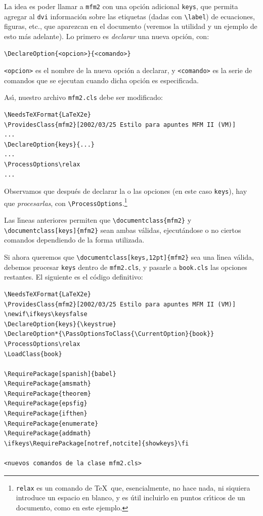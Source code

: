 {La idea es poder llamar a \verb+mfm2+ con una opci\'on adicional
\verb+keys+, que permita agregar al \verb+dvi+ informaci\'on sobre las
etiquetas (dadas con \verb+\label+) de ecuaciones, figuras, etc., que
aparezcan en el documento (veremos la utilidad y un ejemplo de esto
 m\'as adelante). Lo primero es {\em declarar\/} una nueva opci\'on,
 con:
\begin{verbatim}
\DeclareOption{<opcion>}{<comando>}
\end{verbatim}
\verb+<opcion>+ es el nombre de la nueva opci\'on a declarar, y
\verb+<comando>+ es la serie de comandos que se ejecutan cuando dicha
opci\'on es especificada. 

As\'{\i}, nuestro archivo \verb+mfm2.cls+ debe ser modificado:
\begin{verbatim}
\NeedsTeXFormat{LaTeX2e}
\ProvidesClass{mfm2}[2002/03/25 Estilo para apuntes MFM II (VM)]
...
\DeclareOption{keys}{...}
...
\ProcessOptions\relax
...
\end{verbatim}

Observamos que despu\'es de declarar la o las opciones (en este caso
\verb+keys+), hay que {\em procesarlas}, con
\verb+\ProcessOptions+.\footnote{{\tt \bslash relax} es un comando de
    \TeX\ que, esencialmente, no hace nada, ni siquiera introduce un
    espacio en blanco, y es \'util incluirlo en puntos cr\'{\i}ticos
    de un documento, como en este ejemplo.}} 

Las l\'{\i}neas anteriores permiten que \verb+\documentclass{mfm2}+ y
\verb+\documentclass[keys]{mfm2}+ sean ambas v\'alidas, ejecut\'andose
o no ciertos comandos dependiendo de la forma utilizada. 

Si ahora queremos que \verb+\documentclass[keys,12pt]{mfm2}+ sea una
l\'{\i}nea v\'alida, debemos procesar \verb+keys+ dentro de
\verb+mfm2.cls+, y pasarle a \verb+book.cls+ las opciones
restantes. El siguiente es el c\'odigo definitivo:
\begin{verbatim}
\NeedsTeXFormat{LaTeX2e}
\ProvidesClass{mfm2}[2002/03/25 Estilo para apuntes MFM II (VM)]
\newif\ifkeys\keysfalse
\DeclareOption{keys}{\keystrue}
\DeclareOption*{\PassOptionsToClass{\CurrentOption}{book}}
\ProcessOptions\relax
\LoadClass{book}

\RequirePackage[spanish]{babel}
\RequirePackage{amsmath}
\RequirePackage{theorem}
\RequirePackage{epsfig}
\RequirePackage{ifthen}
\RequirePackage{enumerate}
\RequirePackage{addmath}
\ifkeys\RequirePackage[notref,notcite]{showkeys}\fi

<nuevos comandos de la clase mfm2.cls>
\end{verbatim}

